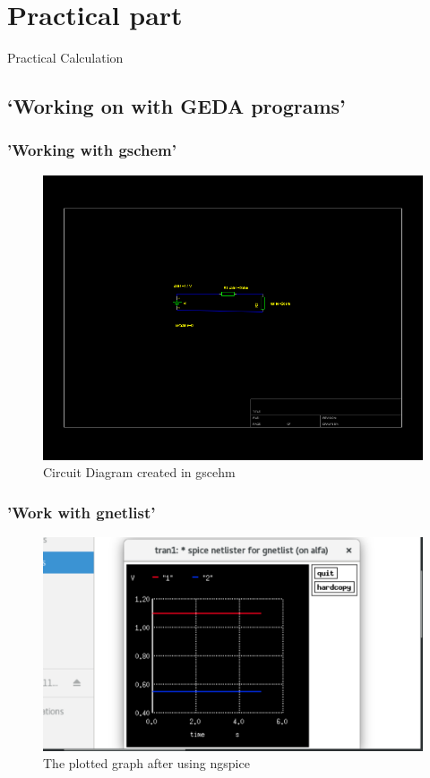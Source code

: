 \documentclass{report}
\begin{document}
 \begin{center}
\end{center}

\chapter{Practical part}
Practical Calculation
\section{‘Working on with GEDA programs'}
\subsection{'Working with gschem'}
\begin{figure}[hbt!]
 \centering
 \caption{Circuit Diagram created in gscehm}
\includegraphics[width=\textwidth]{01.png}
 \end{figure}
\subsection{'Work with gnetlist'}

\begin{figure}[hbt!]
 \centering
  \caption{The plotted graph after using ngspice}
\includegraphics[width=\textwidth]{03.png}
 \end{figure}
 
\end{document}
